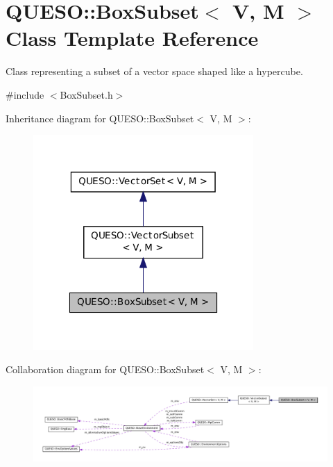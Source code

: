 \hypertarget{class_q_u_e_s_o_1_1_box_subset}{\section{Q\-U\-E\-S\-O\-:\-:Box\-Subset$<$ V, M $>$ Class Template Reference}
\label{class_q_u_e_s_o_1_1_box_subset}
}


Class representing a subset of a vector space shaped like a hypercube.  




{\ttfamily \#include $<$Box\-Subset.\-h$>$}



Inheritance diagram for Q\-U\-E\-S\-O\-:\-:Box\-Subset$<$ V, M $>$\-:
\nopagebreak
\begin{figure}[H]
\begin{center}
\leavevmode
\includegraphics[width=238pt]{class_q_u_e_s_o_1_1_box_subset__inherit__graph}
\end{center}
\end{figure}


Collaboration diagram for Q\-U\-E\-S\-O\-:\-:Box\-Subset$<$ V, M $>$\-:
\nopagebreak
\begin{figure}[H]
\begin{center}
\leavevmode
\includegraphics[width=350pt]{class_q_u_e_s_o_1_1_box_subset__coll__graph}
\end{center}
\end{figure}
